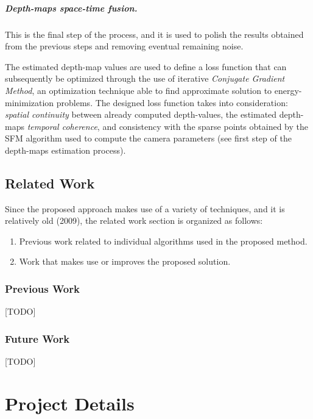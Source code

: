 \documentclass[notitlepage,english]{hgbreport}
\begin{document}
\paragraph{Depth-maps space-time fusion.} This is the final step of the process, and it is used to polish the results obtained from the previous steps and removing eventual remaining noise.

The estimated depth-map values are used to define a loss function  that can subsequently be optimized through the use of iterative \emph{Conjugate Gradient Method}, an optimization technique able to find approximate solution to energy-minimization  problems.
The designed loss function takes into consideration: \emph{spatial continuity} between already computed depth-values, the estimated depth-maps \emph{temporal coherence}, and consistency with the sparse points obtained by the SFM algorithm used to compute the camera parameters (see first step of the depth-maps estimation process).

 

\section{Related Work}
Since the proposed approach makes use of a variety of techniques, and it is relatively old (2009), the related work section is organized as follows:
\begin{enumerate}
	\item Previous work related to individual algorithms used in the proposed method.
	\item Work that makes use or improves the proposed solution. 
\end{enumerate}
\subsection{Previous Work}
[TODO]
\subsection{Future Work}
[TODO]





\chapter{Project Details}
\end{document}
